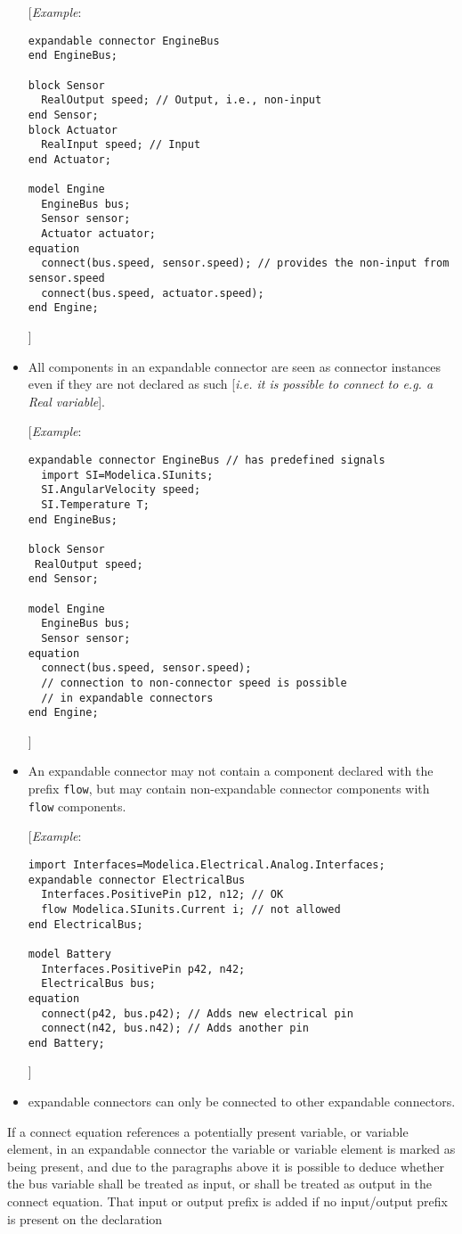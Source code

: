 \begin{itemize}
{[}\emph{Example}:
\begin{lstlisting}[language=modelica]
expandable connector EngineBus
end EngineBus;

block Sensor
  RealOutput speed; // Output, i.e., non-input
end Sensor;
block Actuator
  RealInput speed; // Input
end Actuator;

model Engine
  EngineBus bus;
  Sensor sensor;
  Actuator actuator;
equation
  connect(bus.speed, sensor.speed); // provides the non-input from sensor.speed
  connect(bus.speed, actuator.speed);
end Engine;
\end{lstlisting}
{]}

\item
  All components in an expandable connector are seen as connector
  instances even if they are not declared as such {[}\emph{i.e. it is
  possible to connect to e.g. a Real variable}{]}.

{[}\emph{Example}:
\begin{lstlisting}[language=modelica]
expandable connector EngineBus // has predefined signals
  import SI=Modelica.SIunits;
  SI.AngularVelocity speed;
  SI.Temperature T;
end EngineBus;

block Sensor
 RealOutput speed;
end Sensor;

model Engine
  EngineBus bus;
  Sensor sensor;
equation
  connect(bus.speed, sensor.speed);
  // connection to non-connector speed is possible
  // in expandable connectors
end Engine;
\end{lstlisting}
{]}

\item
  An expandable connector may not contain a component declared with the
  prefix \lstinline!flow!, but may contain non-expandable connector components with
  \lstinline!flow! components.

{[}\emph{Example}:
\begin{lstlisting}[language=modelica]
import Interfaces=Modelica.Electrical.Analog.Interfaces;
expandable connector ElectricalBus
  Interfaces.PositivePin p12, n12; // OK
  flow Modelica.SIunits.Current i; // not allowed
end ElectricalBus;

model Battery
  Interfaces.PositivePin p42, n42;
  ElectricalBus bus;
equation
  connect(p42, bus.p42); // Adds new electrical pin
  connect(n42, bus.n42); // Adds another pin
end Battery;
\end{lstlisting}

{]}

\item
  expandable connectors can only be connected to other expandable
  connectors.
\end{itemize}
  If a connect equation references a potentially present variable, or
  variable element, in an expandable connector the variable or variable
  element is marked as being present, and due to the paragraphs above it
  is possible to deduce whether the bus variable shall be treated as
  input, or shall be treated as output in the connect equation. That
  input or output prefix is added if no input/output prefix is present
  on the declaration

